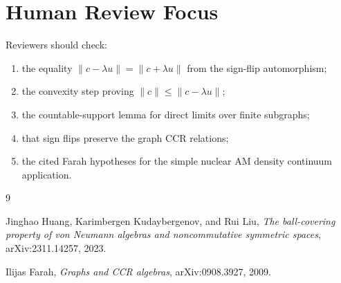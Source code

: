 \documentclass[11pt]{article}
\begin{document}
\section*{Human Review Focus}

Reviewers should check:
\begin{enumerate}
    \item the equality
          \(\|c-\lambda u\|=\|c+\lambda u\|\) from the sign-flip automorphism;
    \item the convexity step proving \(\|c\|\le \|c-\lambda u\|\);
    \item the countable-support lemma for direct limits over finite subgraphs;
    \item that sign flips preserve the graph CCR relations;
    \item the cited Farah hypotheses for the simple nuclear AM density
          continuum application.
\end{enumerate}

\begin{thebibliography}{9}

Jinghao Huang, Karimbergen Kudaybergenov, and Rui Liu,
\emph{The ball-covering property of von Neumann algebras and noncommutative
symmetric spaces},
arXiv:2311.14257, 2023.

Ilijas Farah,
\emph{Graphs and CCR algebras},
arXiv:0908.3927, 2009.

\end{thebibliography}
\end{document}
